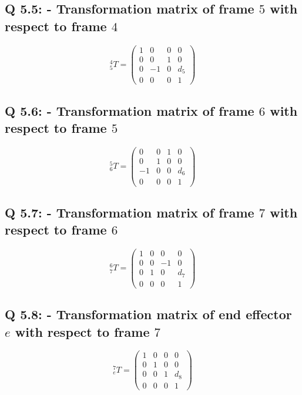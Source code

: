 \subsection{Q 5.5: - Transformation matrix of frame \( 5 \) with respect to frame \( 4 \)}
\[
^{4}_{5}T = \begin{pmatrix}
        1 & 0 & 0 & 0 \\
        0 & 0 & 1 & 0 \\
        0 & -1 & 0 & d_5 \\
        0 & 0 & 0 & 1
    \end{pmatrix}
\]

\subsection{Q 5.6: - Transformation matrix of frame \( 6 \) with respect to frame \( 5 \)}
\[
^{5}_{6}T = \begin{pmatrix}
        0 & 0 & 1 & 0 \\
        0 & 1 & 0 & 0 \\
        -1 & 0 & 0 & d_6 \\
        0 & 0 & 0 & 1
    \end{pmatrix}
\]

\subsection{Q 5.7: - Transformation matrix of frame \( 7 \) with respect to frame \( 6 \)}
\[
^{6}_{7}T = \begin{pmatrix}
        1 & 0 & 0 & 0 \\
        0 & 0 & -1 & 0 \\
        0 & 1 & 0 & d_7 \\
        0 & 0 & 0 & 1
    \end{pmatrix}
\]

\subsection{Q 5.8: - Transformation matrix of end effector \(e\) with respect to frame \( 7 \)}
\[
^{7}_{e}T = \begin{pmatrix}
        1 & 0 & 0 & 0 \\
        0 & 1 & 0 & 0 \\
        0 & 0 & 1 & d_8 \\
        0 & 0 & 0 & 1
    \end{pmatrix}
\]
